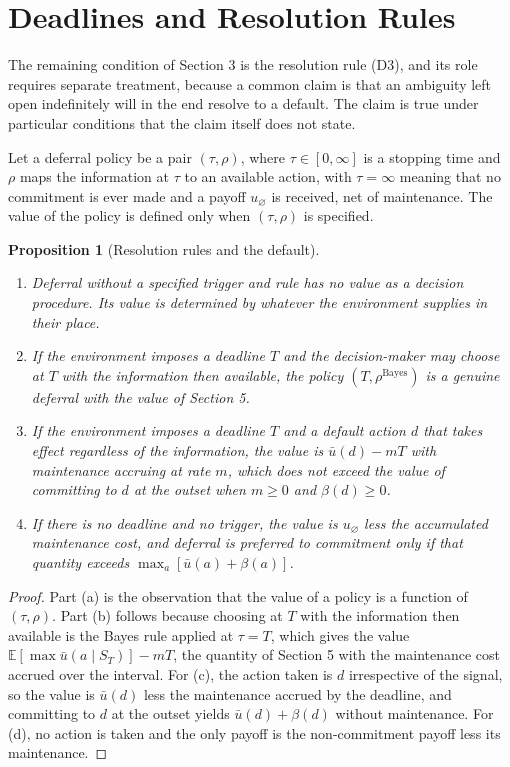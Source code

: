 \documentclass[11pt]{article}
\newtheorem{proposition}{Proposition}
\theoremstyle{remark}
\newcommand{\E}{\mathbb{E}}
\begin{document}
\section{Deadlines and Resolution Rules}

The remaining condition of Section 3 is the resolution rule (D3), and its role requires separate treatment, because a common claim is that an ambiguity left open indefinitely will in the end resolve to a default. The claim is true under particular conditions that the claim itself does not state.

Let a deferral policy be a pair $(\tau,\rho)$, where $\tau\in[0,\infty]$ is a stopping time and $\rho$ maps the information at $\tau$ to an available action, with $\tau=\infty$ meaning that no commitment is ever made and a payoff $u_\varnothing$ is received, net of maintenance. The value of the policy is defined only when $(\tau,\rho)$ is specified.

\begin{proposition}[Resolution rules and the default]
\begin{enumerate}
\item[(a)] Deferral without a specified trigger and rule has no value as a decision procedure. Its value is determined by whatever the environment supplies in their place.
\item[(b)] If the environment imposes a deadline $T$ and the decision-maker may choose at $T$ with the information then available, the policy $(T,\rho^{\mathrm{Bayes}})$ is a genuine deferral with the value of Section 5.
\item[(c)] If the environment imposes a deadline $T$ and a default action $d$ that takes effect regardless of the information, the value is $\bar u(d)-mT$ with maintenance accruing at rate $m$, which does not exceed the value of committing to $d$ at the outset when $m\ge0$ and $\beta(d)\ge0$.
\item[(d)] If there is no deadline and no trigger, the value is $u_\varnothing$ less the accumulated maintenance cost, and deferral is preferred to commitment only if that quantity exceeds $\max_a[\bar u(a)+\beta(a)]$.
\end{enumerate}
\end{proposition}

\begin{proof}
Part (a) is the observation that the value of a policy is a function of $(\tau,\rho)$. Part (b) follows because choosing at $T$ with the information then available is the Bayes rule applied at $\tau=T$, which gives the value $\E[\max\bar u(a\mid S_T)]-mT$, the quantity of Section 5 with the maintenance cost accrued over the interval. For (c), the action taken is $d$ irrespective of the signal, so the value is $\bar u(d)$ less the maintenance accrued by the deadline, and committing to $d$ at the outset yields $\bar u(d)+\beta(d)$ without maintenance. For (d), no action is taken and the only payoff is the non-commitment payoff less its maintenance.
\end{proof}
\end{document}
